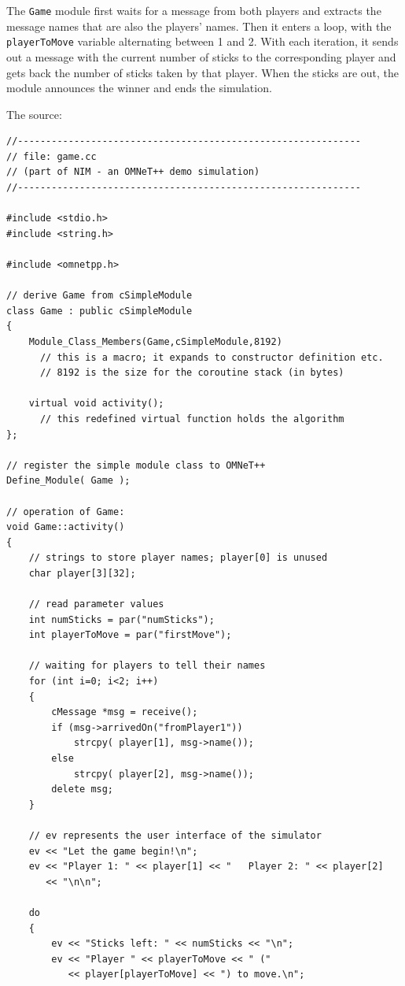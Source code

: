 The \texttt{Game} module first waits for a message from both players
and extracts the message names that are also the players' names.  Then
it enters a loop, with the \texttt{playerToMove} variable
alternating between 1 and 2. With each iteration, it sends out a
message with the current number of sticks to the corresponding player
and gets back the number of sticks taken by that player. When the
sticks are out, the module announces the winner and ends the
simulation.

The source:


\begin{verbatim}
//-------------------------------------------------------------
// file: game.cc
// (part of NIM - an OMNeT++ demo simulation)
//-------------------------------------------------------------

#include <stdio.h>
#include <string.h>

#include <omnetpp.h>

// derive Game from cSimpleModule
class Game : public cSimpleModule
{
    Module_Class_Members(Game,cSimpleModule,8192)
      // this is a macro; it expands to constructor definition etc.
      // 8192 is the size for the coroutine stack (in bytes)

    virtual void activity();
      // this redefined virtual function holds the algorithm
};

// register the simple module class to OMNeT++
Define_Module( Game );

// operation of Game:
void Game::activity()
{
    // strings to store player names; player[0] is unused
    char player[3][32];

    // read parameter values
    int numSticks = par("numSticks");
    int playerToMove = par("firstMove");

    // waiting for players to tell their names
    for (int i=0; i<2; i++)
    {
        cMessage *msg = receive();
        if (msg->arrivedOn("fromPlayer1"))
            strcpy( player[1], msg->name());
        else
            strcpy( player[2], msg->name());
        delete msg;
    }

    // ev represents the user interface of the simulator
    ev << "Let the game begin!\n";
    ev << "Player 1: " << player[1] << "   Player 2: " << player[2]
       << "\n\n";

    do
    {
        ev << "Sticks left: " << numSticks << "\n";
        ev << "Player " << playerToMove << " ("
           << player[playerToMove] << ") to move.\n";


\end{verbatim}
